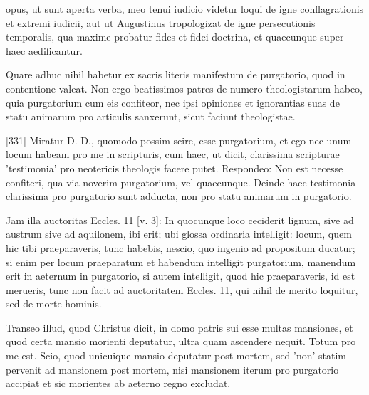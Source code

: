 opus, ut sunt aperta verba, meo tenui iudicio videtur loqui de igne conflagrationis et extremi iudicii, aut ut Augustinus tropologizat de igne persecutionis temporalis, qua maxime probatur fides et fidei doctrina, et quaecunque super haec aedificantur.

Quare adhuc nihil habetur ex sacris literis manifestum de purgatorio, quod in contentione valeat. Non ergo beatissimos patres de numero theologistarum habeo, quia purgatorium cum eis confiteor, nec ipsi opiniones et ignorantias suas de statu animarum pro articulis sanxerunt, sicut faciunt theologistae.

[331] Miratur D. D., quomodo possim scire, esse purgatorium, et ego nec unum locum habeam pro me in scripturis, cum haec, ut dicit, clarissima scripturae 'testimonia' pro neotericis theologis facere putet. Respondeo: Non est necesse confiteri, qua via noverim purgatorium, vel quaecunque. Deinde haec testimonia clarissima pro purgatorio sunt adducta, non pro statu animarum in purgatorio.

Jam illa auctoritas Eccles. 11 [v. 3]: In quocunque loco ceciderit lignum, sive ad austrum sive ad aquilonem, ibi erit; ubi glossa ordinaria intelligit: locum, quem hic tibi praeparaveris, tunc habebis, nescio, quo ingenio ad propositum ducatur; si enim per locum praeparatum et habendum intelligit purgatorium, manendum erit in aeternum in purgatorio, si autem intelligit, quod hic praeparaveris, id est merueris, tunc non facit ad auctoritatem Eccles. 11, qui nihil de merito loquitur, sed de morte hominis.

Transeo illud, quod Christus dicit, in domo patris sui esse multas mansiones, et quod certa mansio morienti deputatur, ultra quam ascendere nequit. Totum pro me est. Scio, quod unicuique mansio deputatur post mortem, sed 'non' statim pervenit ad mansionem post mortem, nisi mansionem iterum pro purgatorio accipiat et sic morientes ab aeterno regno excludat.

